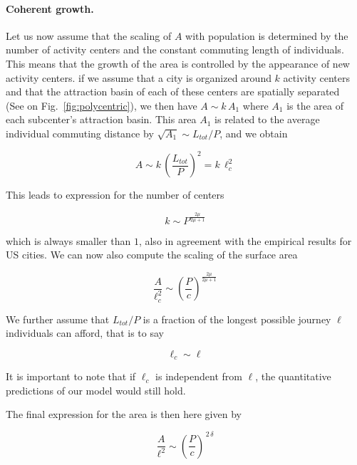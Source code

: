\paragraph{Coherent growth.}

Let us now assume that the scaling of $A$ with population is determined by the
number of activity centers and the constant commuting length of individuals.
This means that the growth of the area is controlled by the appearance of new
activity centers. if we assume that a city is organized around $k$ activity
centers and that the attraction basin of each of these centers are spatially
separated~\cite{Louf:2013_polycentric} (See on Fig.~\ref{fig:polycentric}), we then have  $A \sim k\, A_1$ where $A_1$ is the
area of each subcenter's attraction basin. This area $A_1$ is related to the
average individual commuting distance by $\sqrt{A_1} \sim L_{tot} / P$, and we
obtain

\begin{equation}
    A \sim k\,  \left( \frac{L_{tot}}{P} \right)^2 = k\, \ell_c^2
    \label{eq:area_poly}
\end{equation}

This leads to expression for the number of centers

\begin{equation}
    k \sim P^{\frac{2 \mu}{2\mu+1}}
\end{equation}

which is always smaller than $1$, also in agreement with the empirical results
for US cities. We can now also compute the scaling of the surface area

\begin{equation}
    \frac{A}{\ell_c^2} \sim \left( \frac{P}{c} \right)^{\frac{2 \mu}{2\mu+1}}
\end{equation}

We further assume that $L_{tot} / P$ is a fraction of the longest possible
journey $\ell$ individuals can afford, that is to say 

\begin{equation}
    \ell_c \sim \ell
\end{equation}

It is important to note that if $\ell_c$ is independent from $\ell$, the
quantitative predictions of our model would still hold. 

The final expression for the area is then here given by

\begin{equation}
    \frac{A}{\ell^2} \sim \left( \frac{P}{c} \right)^{\,2\,\delta}
    \label{eq:area}
\end{equation}

